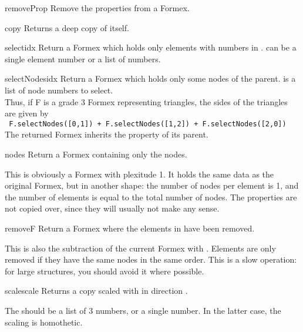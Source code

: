 {{\begin{methoddesc}  {removeProp}{}
Remove the properties from a Formex.
\end{methoddesc}

\begin{methoddesc}  {copy}{}
Returns a deep copy of itself.
\end{methoddesc}

\begin{methoddesc}  {select}{idx}
Return a Formex which holds only elements with numbers in .
 can be a single element number or a list of numbers.
\end{methoddesc}

\begin{methoddesc}  {selectNodes}{idx}
Return a Formex which holds only some nodes of the parent.  is a list of node numbers to select.\\
Thus, if F is a grade 3 Formex representing triangles, the sides of the triangles are given by\\
\verb? F.selectNodes([0,1]) + F.selectNodes([1,2]) + F.selectNodes([2,0]) ?\\
The returned Formex inherits the property of its parent.
\end{methoddesc}

\begin{methoddesc}  {nodes}{}
Return a Formex containing only the nodes.

This is obviously a Formex with plexitude 1. It holds the same data as the original Formex, but in another shape: the number of nodes per element is 1, and the number of elements is equal to the total number of nodes. The properties are not copied over, since they will usually not make any sense.
\end{methoddesc}

\begin{methoddesc}  {remove}{F}
Return a Formex where the elements in  have been removed.

This is also the subtraction of the current Formex with . Elements are only removed if they have the same nodes in the same order. This is a slow operation: for large structures, you should avoid it where possible.
\end{methoddesc}

\begin{methoddesc}  {scale}{scale}
Returns a copy scaled with  in direction .

The  should be a list of 3 numbers, or a single number. In the latter case, the scaling is homothetic.
\end{methoddesc}

}}
